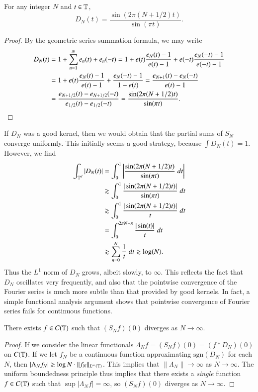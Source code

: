 \begin{theorem}
    For any integer $N$ and $t \in \operatorname{\mathbb{T}}$,
    \[ D_N(t) = \frac{\sin(2\pi(N+1/2)t)}{\sin(\pi t)}. \]
\end{theorem}
\begin{proof}
    By the geometric series summation formula, we may write
    \begin{align*}
        D_N(t) &= 1 + \sum_{n = 1}^N e_n(t) + e_n(-t) = 1 + e(t) \frac{e_N(t) - 1}{e(t) - 1} + e(-t) \frac{e_N(-t) - 1}{e(-t) - 1}\\
        &= 1 + e(t) \frac{e_N(t) - 1}{e(t) - 1} + \frac{e_N(-t) - 1}{1 - e(t)} = \frac{e_{N+1}(t) - e_N(-t)}{e(t) - 1}\\
        &= \frac{e_{N+1/2}(t) - e_{N+1/2}(-t)}{e_{1/2}(t) - e_{1/2}(-t)} = \frac{\sin(2 \pi (N + 1/2)t)}{\sin(\pi t)}. \qedhere
    \end{align*}
\end{proof}

If $D_N$ was a good kernel, then we would obtain that the partial sums of $S_N$ converge uniformly. This initially seems a good strategy, because $\int D_N(t) = 1$. However, we find
%
\begin{align*}
    \int_{\operatorname{\mathbb{T}}^d} |D_N(t)| &= \int_0^1 \left| \frac{\sin(2 \pi (N + 1/2)t)}{\sin(\pi t)}\; dt \right|\\
    &\gtrsim \int_0^1 \frac{|\sin(2 \pi (N+1/2) t)|}{\sin(\pi t)}\; dt\\
    &\gtrsim \int_0^1 \frac{|\sin(2 \pi (N+1/2) t)|}{t}\; dt\\
    &= \int_0^{2 \pi N + \pi} \frac{|\sin(t)|}{t}\; dt\\
    &\gtrsim \sum_{n = 0}^N \frac{1}{t}\; dt \gtrsim \log(N).
\end{align*}
%
Thus the $L^1$ norm of $D_N$ grows, albeit slowly, to $\infty$. This reflects the fact that $D_N$ oscillates very frequently, and also that the pointwise convergence of the Fourier series is much more subtle than that provided by good kernels. In fact, a simple functional analysis argument shows that pointwise convergence of Fourier series fails for continuous functions.

\begin{theorem}
    There exists $f \in C(\operatorname{\mathbb{T}})$ such that $(S_N f)(0)$ diverges as $N \to \infty$.
\end{theorem}
\begin{proof}
    If we consider the linear functionals $\Lambda_N f = (S_N f)(0) = (f * D_N)(0)$ on $C(\operatorname{\mathbb{T}})$. If we let $f_N$ be a continuous function approximating $\text{sgn}(D_N)$ for each $N$, then $|\Lambda_N f_N| \gtrsim \log N \cdot \| f_N \|_{L^\infty(\operatorname{\mathbb{T}})}$. This implies that $\| \Lambda_N \| \to \infty$ as $N \to \infty$. The uniform boundedness principle thus implies that there exists a {\it single} function $f \in C(\operatorname{\mathbb{T}})$ such that $\sup |\Lambda_N f| = \infty$, so $(S_N f)(0)$ diverges as $N \to \infty$.
\end{proof}

